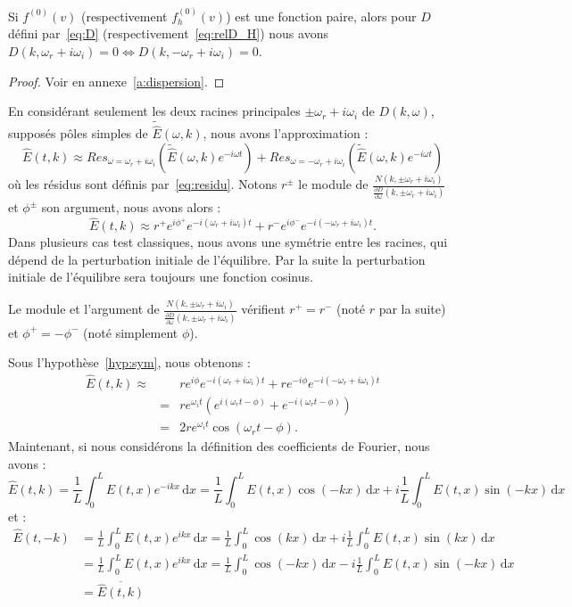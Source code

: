 \begin{lemma}
  Si $f^{(0)}(v)$ (respectivement $f_h^{(0)}(v)$) est une fonction paire, alors pour $D$ défini par~\eqref{eq:D} (respectivement~\eqref{eq:relD_H}) nous avons $D(k,\omega_r+i\omega_i) = 0 \Leftrightarrow D(k,-\omega_r+i\omega_i)=0$.
  \label{lemma:doubleracine}
\end{lemma}
\begin{proof}
  Voir en annexe~\ref{a:dispersion}.
\end{proof}

En considérant seulement les deux racines principales $\pm\omega_r + i\omega_i$ de $D(k,\omega)$, supposés pôles simples de $\tilde{\hat{E}}(\omega,k)$, nous avons l'approximation :
$$
  \hat{E}(t,k)\approx Res_{\omega=\omega_r+i\omega_i}\left(\tilde{\hat{E}}(\omega,k)e^{-i\omega t}\right)+Res_{\omega=-\omega_r+i\omega_i}\left(\tilde{\hat{E}}(\omega,k)e^{-i\omega t}\right)
$$
où les résidus sont définis par~\eqref{eq:residu}. Notons $r^\pm$ le module de $\frac{N(k,\pm\omega_r+i\omega_i)}{\frac{\partial D}{\partial \omega}(k,\pm\omega_r+i\omega_i)}$ et $\phi^\pm$ son argument, nous avons alors :
\begin{equation}
  \hat{E}(t,k)\approx r^+e^{i\phi^+}e^{-i(\omega_r+i\omega_i)t}+r^-e^{i\phi^-}e^{-i(-\omega_r+i\omega_i)t}. 
  \label{eq:Etk_sanssym}
\end{equation}
Dans plusieurs cas test classiques, nous avons une symétrie entre les racines, qui dépend de la perturbation initiale de l'équilibre. Par la suite la perturbation initiale de l'équilibre sera toujours une fonction cosinus.

\begin{hyp}
  Le module et l'argument de $\frac{N(k,\pm\omega_r+i\omega_i)}{\frac{\partial D}{\partial \omega}(k,\pm\omega_r+i\omega_i)}$  vérifient $r^+ = r^-$ (noté $r$ par la suite) et $\phi^+ = -\phi^-$ (noté simplement $\phi$).
  \label{hyp:sym}
\end{hyp}
Sous l'hypothèse~\ref{hyp:sym}, nous obtenons :
\begin{eqnarray}
  \hat{E}(t,k)\approx&& re^{i\phi}e^{-i(\omega_r+i\omega_i)t}+re^{-i\phi}e^{-i(-\omega_r+i\omega_i)t} \nonumber\\
  &=&re^{\omega_i t}\left(e^{i(\omega_r t-\phi)}+e^{-i(\omega_r t-\phi)}\right)\nonumber\\
  &=&2re^{\omega_i t}\cos\left(\omega_r t-\phi\right).
  \label{eq:Etk}
\end{eqnarray}
Maintenant, si nous considérons la définition des coefficients de Fourier, nous avons :
$$
  \hat{E}(t,k) = \frac{1}{L}\int_0^L E(t,x)e^{-ikx}\,\mathrm{d}x = \frac{1}{L}\int_0^L E(t,x)\cos(-kx)\,\mathrm{d}x + i\frac{1}{L}\int_0^L E(t,x)\sin(-kx)\,\mathrm{d}x
$$
et :
$$
  \begin{aligned}
    \hat{E}(t,-k) 
      & = \frac{1}{L}\int_0^L E(t,x)e^{ikx}\,\mathrm{d}x = \frac{1}{L}\int_0^L\cos(kx)\,\mathrm{d}x + i\frac{1}{L}\int_0^L E(t,x)\sin(kx)\,\mathrm{d}x \\
      & = \frac{1}{L}\int_0^L E(t,x)e^{ikx}\,\mathrm{d}x = \frac{1}{L}\int_0^L\cos(-kx)\,\mathrm{d}x - i\frac{1}{L}\int_0^L E(t,x)\sin(-kx)\,\mathrm{d}x \\
      & = \overline{\hat{E}(t,k)}
  \end{aligned}
$$

